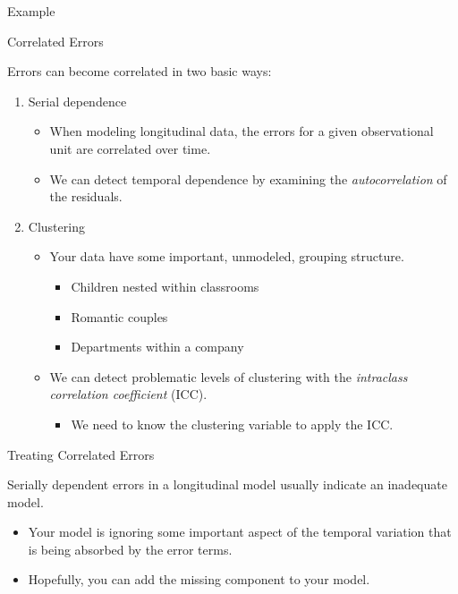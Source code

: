 \documentclass[10pt]{beamer}\usepackage[]{graphicx}\usepackage[]{color}
\begin{document}
{\begin{frame}{Example}
\end{frame}

\watermarkon %

\begin{frame}{Correlated Errors}

  Errors can become correlated in two basic ways:
  \vb
  \begin{enumerate}
  \item Serial dependence
    \begin{itemize}
    \item When modeling longitudinal data, the errors for a given observational
      unit are correlated over time.
      \vc
    \item We can detect temporal dependence by examining the
      \emph{autocorrelation} of the residuals.
    \end{itemize}
    \vb
  \item Clustering
    \begin{itemize}
    \item Your data have some important, unmodeled, grouping structure.
      \begin{itemize}
      \item Children nested within classrooms
      \item Romantic couples
      \item Departments within a company
      \end{itemize}
      \vc
    \item We can detect problematic levels of clustering with the
      \emph{intraclass correlation coefficient} (ICC).
      \begin{itemize}
      \item We need to know the clustering variable to apply the ICC.
      \end{itemize}
    \end{itemize}
  \end{enumerate}

\end{frame}


\begin{frame}[allowframebreaks]{Treating Correlated Errors}

  Serially dependent errors in a longitudinal model usually indicate an
  inadequate model.
  \vc
  \begin{itemize}
  \item Your model is ignoring some important aspect of the temporal variation
    that is being absorbed by the error terms.
    \vc
  \item Hopefully, you can add the missing component to your model.
  \end{itemize}


\end{frame}}
\end{document}
